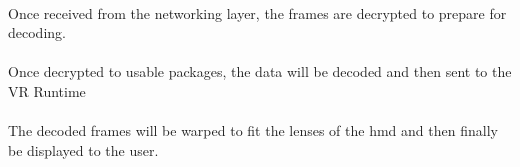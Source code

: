 \paragraph{\textCDCR}
Once received from the networking layer, the frames are decrypted to prepare for decoding.
\paragraph{\textCDCO}
Once decrypted to usable packages, the data will be decoded and then sent to the VR Runtime
\paragraph{\textCRD}
The decoded frames will be warped to fit the lenses of the \acrshort{hmd} and then finally be displayed to the user.

